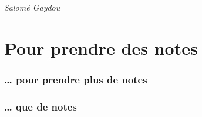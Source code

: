 \documentclass[
  10pt,
  french,
  a5paper,
  openany]{book}
\newenvironment{signature}{\begin{flushright}}{\end{flushright}}
\begin{document}
\begin{signature}
\emph{Salomé Gaydou}

\end{signature}

\hypertarget{pour-prendre-des-notes}{%
\chapter*{Pour prendre des notes}\label{pour-prendre-des-notes}}

\clearpage

\hypertarget{pour-prendre-plus-de-notes}{%
\subsection*{\ldots{} pour prendre plus de notes}\label{pour-prendre-plus-de-notes}}

\clearpage

\hypertarget{que-de-notes}{%
\subsection*{\ldots{} que de notes}\label{que-de-notes}}
\end{document}
